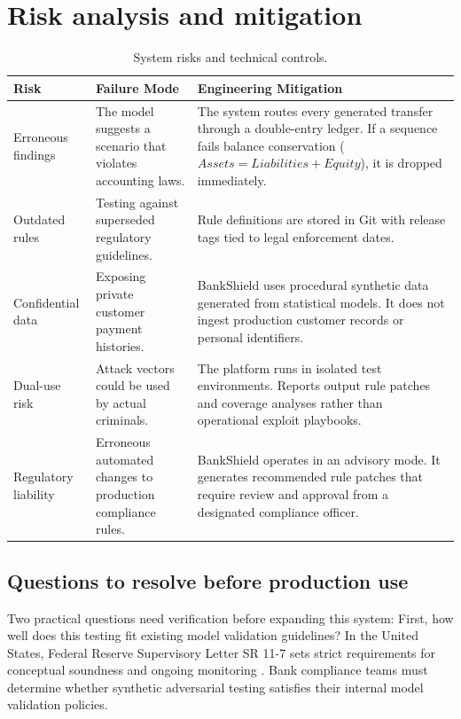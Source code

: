 \documentclass[10pt,twocolumn,a4paper]{article}
\begin{document}
\section{Risk analysis and mitigation}

\begin{table}[t]
\centering
\small
\begin{tabular}{@{}p{3.0cm}p{4.4cm}p{9.4cm}@{}}
\toprule
\textbf{Risk} & \textbf{Failure Mode} & \textbf{Engineering Mitigation} \\ \midrule
Erroneous findings & The model suggests a scenario that violates accounting laws. & The system routes every generated transfer through a double-entry ledger. If a sequence fails balance conservation ($Assets = Liabilities + Equity$), it is dropped immediately. \\ \midrule
Outdated rules & Testing against superseded regulatory guidelines. & Rule definitions are stored in Git with release tags tied to legal enforcement dates. \\ \midrule
Confidential data & Exposing private customer payment histories. & BankShield uses procedural synthetic data generated from statistical models. It does not ingest production customer records or personal identifiers. \\ \midrule
Dual-use risk & Attack vectors could be used by actual criminals. & The platform runs in isolated test environments. Reports output rule patches and coverage analyses rather than operational exploit playbooks. \\ \midrule
Regulatory liability & Erroneous automated changes to production compliance rules. & BankShield operates in an advisory mode. It generates recommended rule patches that require review and approval from a designated compliance officer. \\ \bottomrule
\end{tabular}
\caption{System risks and technical controls.}
\label{tab:risks}
\end{table}

\subsection{Questions to resolve before production use}
Two practical questions need verification before expanding this system:
First, how well does this testing fit existing model validation guidelines? In the United States, Federal Reserve Supervisory Letter SR 11-7 sets strict requirements for conceptual soundness and ongoing monitoring \cite{fedsr117}. Bank compliance teams must determine whether synthetic adversarial testing satisfies their internal model validation policies.
\end{document}
